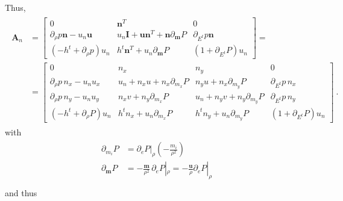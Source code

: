 \documentclass[letterpaper,10pt,english]{jupyterBook}
\begin{document}
\sphinxAtStartPar
Thus,
\begin{equation*}
\begin{split}\begin{aligned}
\mathbf{A}_n 
& =
\begin{bmatrix}
  0 & \mathbf{n}^T & 0 \\
  \partial_\rho p \mathbf{n} - u_n \mathbf{u} & u_n \mathbf{I} + \mathbf{u} \mathbf{n}^T + \mathbf{n} \partial_{\mathbf{m}} P & \partial_{E^t} p \mathbf{n} \\
  ( - h^t + \partial_\rho p ) u_n & h^t \mathbf{n}^T + u_n \partial_{\mathbf{m}} P & \left( 1 + \partial_{E^t} P \right) u_n
\end{bmatrix} = \\
& =
\begin{bmatrix}
  0 & n_x & n_y & 0 \\
  \partial_\rho p \, n_x - u_n u_x & u_n + n_x u + n_x \partial_{m_x} P &       n_y u + n_x \partial_{m_y} P & \partial_{E^t} p \, n_x \\
  \partial_\rho p \, n_y - u_n u_y &       n_x v + n_y \partial_{m_x} P & u_n + n_y v + n_y \partial_{m_y} P & \partial_{E^t} p \, n_y \\
  ( - h^t + \partial_\rho P ) u_n & h^t n_x + u_n \partial_{m_x} P & h^t n_y + u_n \partial_{m_y} P & \left( 1 + \partial_{E^t} P \right) u_n
\end{bmatrix} \ .
\end{aligned}\end{split}
\end{equation*}
\sphinxAtStartPar
with
\begin{equation*}
\begin{split}\begin{aligned}
  \partial_{m_i} P        & = \partial_e P|_{\rho} \left(-\frac{m_i}{\rho^2} \right) \\
  \partial_{\mathbf{m}} P & = - \frac{\mathbf{m}}{\rho^2} \, \partial_e P|_{\rho} = - \frac{\mathbf{u}}{\rho} \partial_e P|_{\rho} \\
\end{aligned}\end{split}
\end{equation*}
\sphinxAtStartPar
and thus
\end{document}
